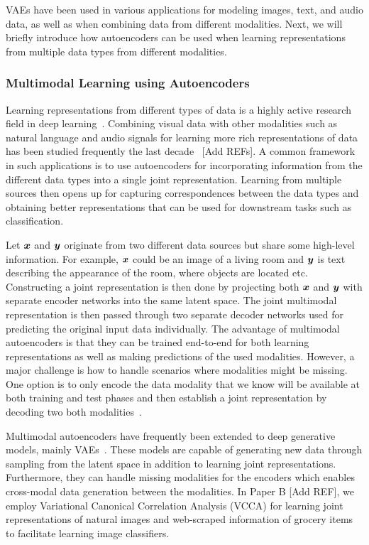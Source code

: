 VAEs have been used in various applications for modeling images, text, and audio data, as well as when combining data from different modalities. Next, we will briefly introduce how autoencoders can be used when learning representations from multiple data types from different modalities. 



\subsubsection{Multimodal Learning using Autoencoders}

Learning representations from different types of data is a highly active research field in deep learning~\cite{baltruvsaitis2018multimodal}. Combining visual data with other modalities such as natural language and audio signals for learning more rich representations of data has been studied frequently the last decade~\cite{owens2018audio, ngiam2011multimodal, silberer2014learning, lee2020making} [Add REFs]. A common framework in such applications is to use autoencoders for incorporating information from the different data types into a single joint representation. Learning from multiple sources then opens up for capturing correspondences between the data types and obtaining better representations that can be used for downstream tasks such as classification. 

Let ${\bm{x}}$ and ${\bm{y}}$ originate from two different data sources but share some high-level information. For example, ${\bm{x}}$ could be an image of a living room and ${\bm{y}}$ is text describing the appearance of the room, where objects are located etc. Constructing a joint representation is then done by projecting both ${\bm{x}}$ and ${\bm{y}}$ with separate encoder networks into the same latent space. The joint multimodal representation is then passed through two separate decoder networks used for predicting the original input data individually. The advantage of multimodal autoencoders is that they can be trained end-to-end for both learning representations as well as making predictions of the used modalities. However, a major challenge is how to handle scenarios where modalities might be missing. One option is to only encode the data modality that we know will be available at both training and test phases and then establish a joint representation by decoding two both modalities~\cite{ngiam2011multimodal}.

Multimodal autoencoders have frequently been extended to deep generative models, mainly VAEs~\cite{wang2016deep, wu2018multimodal, shi2019variational, vedantam2017generative, suzuki2016joint}. These models are capable of generating new data through sampling from the latent space in addition to learning joint representations. Furthermore, they can handle missing modalities for the encoders which enables cross-modal data generation between the modalities. In Paper B [Add REF], we employ Variational Canonical Correlation Analysis (VCCA) for learning joint representations of natural images and web-scraped information of grocery items to facilitate learning image classifiers. 


